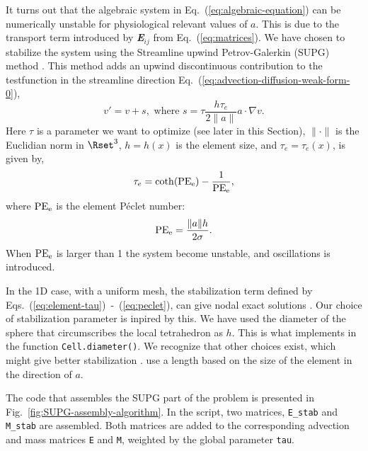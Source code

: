 It turns out that the algebraic system in Eq.~(\ref{eq:algebraic-equation}) can be numerically unstable for physiological relevant values of $a$. This is due to the transport term introduced by {\bfseries\itshape E}$_{ij}$ from Eq.~(\ref{eq:matrices}). We have chosen to stabilize the system using the Streamline upwind Petrov-Galerkin (SUPG) method \cite{BrooksHughes1982}. This method adds an upwind discontinuous contribution to the testfunction in the streamline direction Eq.~(\ref{eq:advection-diffusion-weak-form-0}),
\begin{equation}
  \label{eq:stabilizing-term}
  v' = v+s, \text{ where } s = \tau\frac{h\tau_e}{2\|a\|}a\cdot\nabla v.
\end{equation}
Here $\tau$ is a parameter we want to optimize (see later in this Section), $\|\cdot\|$ is the Euclidian norm in $\Rset^3$, $h=h(x)$ is the element size, and $\tau_e=\tau_e(x)$, is given by,
\begin{equation}
  \label{eq:element-tau}
  \tau_e=\coth(\mathrm{PE}_{\mathrm{e}})-\frac{1}{\mathrm{PE}_{\mathrm{e}}},
\end{equation}
where $\mathrm{PE}_{\mathrm{e}}$ is the element P\'eclet number:
\begin{equation}
  \label{eq:peclet}
  \mathrm{PE}_{\mathrm{e}} = \frac{\|a\|h}{2\sigma}.
\end{equation}
When $\mathrm{PE}_{\mathrm{e}}$ is larger than 1 the system become unstable, and oscillations is introduced.\par

In the 1D case, with a uniform mesh, the stabilization term defined by Eqs.~(\ref{eq:element-tau})~-~(\ref{eq:peclet}), can give nodal exact solutions \cite{ChristieGriffithsEtAl1976,BrooksHughes1982}. Our choice of stabilization parameter is inpired by this. We have used the diameter of the sphere that circumscribes the local tetrahedron as $h$. This is what \dolfin implements in the function \texttt{Cell.diameter()}. We recognize that other choices exist, which might give better stabilization \cite{JohnKnobloch2007}. \citet{TezduyarPark1986} use a length based on the size of the element in the direction of $a$.\par

The \pydolfin code that assembles the SUPG part of the problem is presented in Fig.~\ref{fig:SUPG-assembly-algorithm}. In the script, two matrices, \texttt{E\_stab} and \texttt{M\_stab} are assembled. Both matrices are added to the corresponding advection and mass matrices \texttt{E} and \texttt{M}, weighted by the global parameter \texttt{tau}.\par

